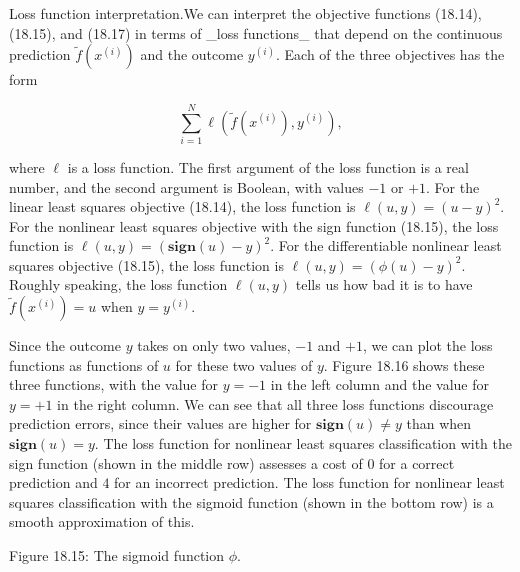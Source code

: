 
Loss function interpretation.We can interpret the objective functions (18.14), (18.15), and (18.17) in terms of _loss functions_ that depend on the continuous prediction \(\tilde{f}(x^{(i)})\) and the outcome \(y^{(i)}\). Each of the three objectives has the form

\[\sum_{i=1}^{N}\ell(\tilde{f}(x^{(i)}),y^{(i)}),\]

where \(\ell\) is a loss function. The first argument of the loss function is a real number, and the second argument is Boolean, with values \(-1\) or \(+1\). For the linear least squares objective (18.14), the loss function is \(\ell(u,y)=(u-y)^{2}\). For the nonlinear least squares objective with the sign function (18.15), the loss function is \(\ell(u,y)=(\mathbf{sign}(u)-y)^{2}\). For the differentiable nonlinear least squares objective (18.15), the loss function is \(\ell(u,y)=(\phi(u)-y)^{2}\). Roughly speaking, the loss function \(\ell(u,y)\) tells us how bad it is to have \(\tilde{f}(x^{(i)})=u\) when \(y=y^{(i)}\).

Since the outcome \(y\) takes on only two values, \(-1\) and \(+1\), we can plot the loss functions as functions of \(u\) for these two values of \(y\). Figure 18.16 shows these three functions, with the value for \(y=-1\) in the left column and the value for \(y=+1\) in the right column. We can see that all three loss functions discourage prediction errors, since their values are higher for \(\mathbf{sign}(u)\neq y\) than when \(\mathbf{sign}(u)=y\). The loss function for nonlinear least squares classification with the sign function (shown in the middle row) assesses a cost of \(0\) for a correct prediction and \(4\) for an incorrect prediction. The loss function for nonlinear least squares classification with the sigmoid function (shown in the bottom row) is a smooth approximation of this.

Figure 18.15: The sigmoid function \(\phi\).

 